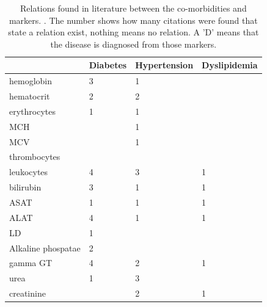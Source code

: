 \documentclass[10pt,a4paper]{report}
\begin{document}
	\begin{table}[]
		\centering
		\caption{Relations found in literature between the co-morbidities and markers. \cite{Deneer2017Thesis}. The number shows how many citations were found that state a relation exist, nothing means no relation. A 'D' means that the disease is diagnosed from those markers.}
		\label{tab:CoMorMarkRel}
		\begin{tabular}{llll}
			\hline
			& \textbf{Diabetes} & \textbf{Hypertension} & \textbf{Dyslipidemia} \\ \hline
			hemoglobin            & 3                 & 1                     &                       \\
			hematocrit            & 2                 & 2                     &                       \\
			erythrocytes          & 1                 & 1                     &                       \\
			MCH                   &                   & 1                     &                       \\
			MCV                   &                   & 1                     &                       \\
			thrombocytes          &                   &                       &                       \\
			leukocytes            & 4                 & 3                     & 1                     \\
			bilirubin             & 3                 & 1                     & 1                     \\
			ASAT                  & 1                 & 1                     & 1                     \\
			ALAT                  & 4                 & 1                     & 1                     \\
			LD                    & 1                 &                       &                       \\
			Alkaline phospatae    & 2                 &                       &                       \\
			gamma GT              & 4                 & 2                     & 1                     \\
			urea                  & 1                 & 3                     &                       \\
			creatinine            &                   & 2                     & 1                     \\

\end{tabular}
\end{table}
\end{document}
